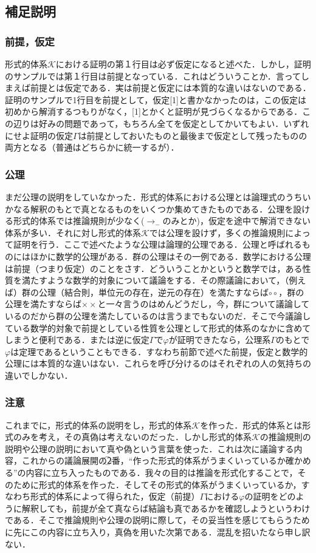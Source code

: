 \documentclass[10pt,b5paper,papersize,dvipdfmx]{jsbook}
\newcommand\maru[1]{\textcircled{\scriptsize{}#1}}
\newcommand\DQ[1]{“#1”}
\begin{document}
\subsection{補足説明}
\subsubsection{前提，仮定}
形式的体系$\mathcal K$における証明の第１行目は必ず仮定になると述べた．しかし，証明のサンプルでは第１行目は前提となっている．これはどういうことか．言ってしまえば前提とは仮定である．実は前提と仮定には本質的な違いはないのである．証明のサンプルで1行目を前提として，仮定[1]と書かなかったのは，この仮定は初めから解消するつもりがなく，[1]とかくと証明が見づらくなるからである．この辺りは好みの問題であって，もちろん全てを仮定としてかいてもよい．いずれにせよ証明の仮定$\Gamma$は前提としておいたものと最後まで仮定として残ったものの両方となる（普通はどちらかに統一するが）．

\subsubsection{公理}
まだ公理の説明をしていなかった．形式的体系における公理とは論理式のうちいかなる解釈のもとで真となるものをいくつか集めてきたものである．公理を設ける形式的体系では推論規則が少なく($\to_-$のみとか)，仮定を途中で解消できない体系が多い．それに対し形式的体系$\mathcal K$では公理を設けず，多くの推論規則によって証明を行う．ここで述べたような公理は論理的公理である．公理と呼ばれるものにはほかに数学的公理がある．群の公理はその一例である．数学における公理は前提（つまり仮定）のことをさす．どういうことかというと数学では，ある性質を満たすような数学的対象について議論をする．その際議論において，（例えば）群の公理（結合則，単位元の存在，逆元の存在）を満たすならば$\circ \circ$，群の公理を満たすならば$\times \times$と一々言うのはめんどうだし，今，群について議論しているのだから群の公理を満たしているのは言うまでもないのだ．そこで今議論している数学的対象で前提としている性質を公理として形式的体系のなかに含めてしまうと便利である．または逆に仮定$\Gamma$で$\varphi$が証明できたなら，公理系$\Gamma$のもとで$\varphi$は定理であるということもできる．すなわち前節で述べた前提，仮定と数学的公理には本質的な違いはない．これらを呼び分けるのはそれぞれの人の気持ちの違いでしかない．

\subsubsection{注意}
これまでに，形式的体系の説明をし，形式的体系$\mathcal K$を作った．形式的体系とは形式のみを考え，その真偽は考えないのだった．しかし$形式的体系\mathcal K$の推論規則の説明や公理の説明において真や偽という言葉を使った．これは次に議論する内容，これからの議論展開の\maru{2}番，\DQ{作った形式的体系がうまくいっているか確かめる}の内容に立ち入ったものである．我々の目的は推論を形式化することで，そのために形式的体系を作った．そしてその形式的体系がうまくいっているか，すなわち形式的体系によって得られた，仮定（前提）$\Gamma$における$\varphi$の証明をどのように解釈しても，前提が全て真ならば結論も真であるかを確認しようというわけである．そこで推論規則や公理の説明に際して，その妥当性を感じてもらうために先にこの内容に立ち入り，真偽を用いた次第である．混乱を招いたなら申し訳ない．
\end{document}
